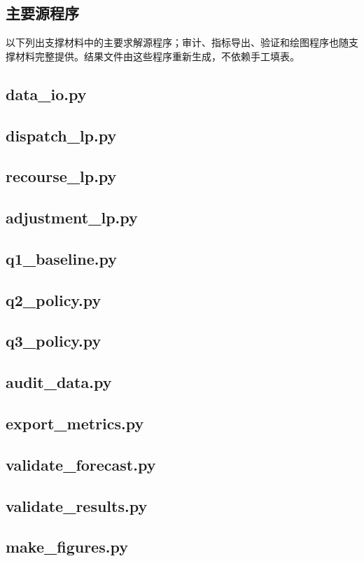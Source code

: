\documentclass[withoutpreface]{cumcmthesis}
\begin{document}
\begin{appendices}
\section{主要源程序}
以下列出支撑材料中的主要求解源程序；审计、指标导出、验证和绘图程序也随支撑材料完整提供。结果文件由这些程序重新生成，不依赖手工填表。

\subsection{data\_io.py}

\subsection{dispatch\_lp.py}

\subsection{recourse\_lp.py}

\subsection{adjustment\_lp.py}

\subsection{q1\_baseline.py}

\subsection{q2\_policy.py}

\subsection{q3\_policy.py}

\subsection{audit\_data.py}

\subsection{export\_metrics.py}

\subsection{validate\_forecast.py}

\subsection{validate\_results.py}

\subsection{make\_figures.py}

\end{appendices}
\end{document}
